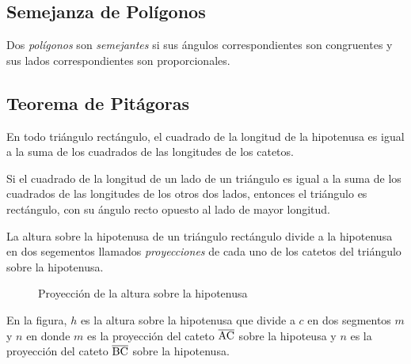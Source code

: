 \subsection{Semejanza de Polígonos}

\begin{definition}
    Dos \textit{polígonos} son \textit{semejantes} si sus ángulos correspondientes son congruentes y sus lados correspondientes son proporcionales.
\end{definition}


\subsection{Teorema de Pitágoras}

\begin{theorem}
    En todo triángulo rectángulo, el cuadrado de la longitud de la hipotenusa es igual a la suma de los cuadrados de las longitudes de los catetos.
\end{theorem}

\begin{theorem}
    Si el cuadrado de la longitud de un lado de un triángulo es igual a la suma de los cuadrados de las longitudes de los otros dos lados, entonces el triángulo es rectángulo, con su ángulo recto opuesto al lado de mayor longitud.
\end{theorem}

\begin{definition}

    La altura sobre la hipotenusa de un triángulo rectángulo divide a la hipotenusa en dos segementos llamados \textit{proyecciones} de cada uno de los catetos del triángulo sobre la hipotenusa.

    \begin{figure}[!h]
        \centering
        
        \caption{Proyección de la altura sobre la hipotenusa}
        \label{fig:projection-hypothenuse}
    \end{figure}    

    En la figura, $h$ es la altura sobre la hipotenusa que divide a $c$ en dos segmentos $m$ y $n$ en donde $m$ es la proyección del cateto $\overline{\rm AC}$ sobre la hipoteusa y $n$ es la proyección del cateto $\overline{\rm BC}$ sobre la hipotenusa.
\end{definition}

